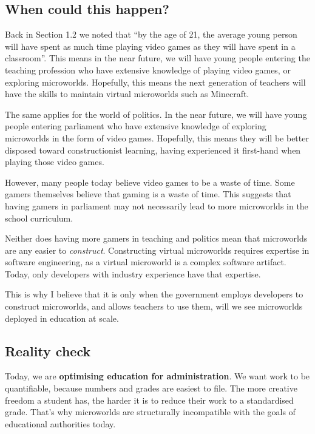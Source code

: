 \subsection{When could this happen?}

Back in Section 1.2 we noted that ``by the age of 21, the average young
person will have spent as much time playing video games as they will
have spent in a classroom''. This means in the near future, we will have
young people entering the teaching profession who have extensive
knowledge of playing video games, or exploring microworlds. Hopefully,
this means the next generation of teachers will have the skills to
maintain virtual microworlds such as Minecraft.

The same applies for the world of politics. In the near future, we will
have young people entering parliament who have extensive knowledge of
exploring microworlds in the form of video games. Hopefully, this means
they will be better disposed toward constructionist learning, having
experienced it first-hand when playing those video games.

However, many people today believe video games to be a waste of
time\cite{debate}. Some gamers themselves believe that gaming is a waste of
time\cite{reddit:waste}. This suggests that having gamers in parliament may not
necessarily lead to more microworlds in the school curriculum.

Neither does having more gamers in teaching and politics mean that
microworlds are any easier to \emph{construct}. Constructing virtual
microworlds requires expertise in software engineering, as a virtual
microworld is a complex software artifact. Today, only developers with
industry experience have that expertise.

This is why I believe that it is only when the government employs
developers to construct microworlds, and allows teachers to use them,
will we see microworlds deployed in education at scale.

\subsection{Reality check}

Today, we are \textbf{optimising education for administration}. We want work to be quantifiable, because numbers and grades are easiest to file. The more creative freedom a student has, the harder it is to reduce their work to a standardised grade. That's why microworlds are structurally incompatible with the goals of educational authorities today.

